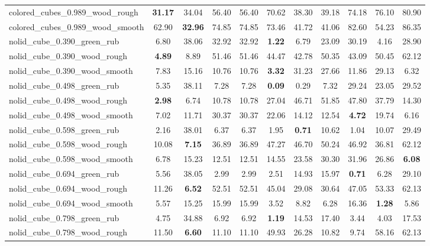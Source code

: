 \begin{table}[H]
{\begin{tabular}{l cccccccccc}
        colored\_cubes\_0.989\_wood\_rough & \textbf{31.17} & 34.04 & 56.40 & 56.40 & 70.62 & 38.30 & 39.18 & 74.18 & 76.10 & 80.90 \\
        colored\_cubes\_0.989\_wood\_smooth & 62.90 & \textbf{32.96} & 74.85 & 74.85 & 73.46 & 41.72 & 41.06 & 82.60 & 54.23 & 86.35 \\
        nolid\_cube\_0.390\_green\_rub & 6.80 & 38.06 & 32.92 & 32.92 & \textbf{1.22} & 6.79 & 23.09 & 30.19 & 4.16 & 28.90 \\
        nolid\_cube\_0.390\_wood\_rough & \textbf{4.89} & 8.89 & 51.46 & 51.46 & 44.47 & 42.78 & 50.35 & 43.09 & 50.45 & 62.12 \\
        nolid\_cube\_0.390\_wood\_smooth & 7.83 & 15.16 & 10.76 & 10.76 & \textbf{3.32} & 31.23 & 27.66 & 11.86 & 29.13 & 6.32 \\
        nolid\_cube\_0.498\_green\_rub & 5.35 & 38.11 & 7.28 & 7.28 & \textbf{0.09} & 0.29 & 7.32 & 29.24 & 23.05 & 29.52 \\
        nolid\_cube\_0.498\_wood\_rough & \textbf{2.98} & 6.74 & 10.78 & 10.78 & 27.04 & 46.71 & 51.85 & 47.80 & 37.79 & 14.30 \\
        nolid\_cube\_0.498\_wood\_smooth & 7.02 & 11.71 & 30.37 & 30.37 & 22.06 & 14.12 & 12.54 & \textbf{4.72} & 19.74 & 6.16 \\
        nolid\_cube\_0.598\_green\_rub & 2.16 & 38.01 & 6.37 & 6.37 & 1.95 & \textbf{0.71} & 10.62 & 1.04 & 10.07 & 29.49 \\
        nolid\_cube\_0.598\_wood\_rough & 10.08 & \textbf{7.15} & 36.89 & 36.89 & 47.27 & 46.70 & 50.24 & 46.92 & 36.81 & 62.12 \\
        nolid\_cube\_0.598\_wood\_smooth & 6.78 & 15.23 & 12.51 & 12.51 & 14.55 & 23.58 & 30.30 & 31.96 & 26.86 & \textbf{6.08} \\
        nolid\_cube\_0.694\_green\_rub & 5.56 & 38.05 & 2.99 & 2.99 & 2.51 & 14.93 & 15.97 & \textbf{0.71} & 6.28 & 29.10 \\
        nolid\_cube\_0.694\_wood\_rough & 11.26 & \textbf{6.52} & 52.51 & 52.51 & 45.04 & 29.08 & 30.64 & 47.05 & 53.33 & 62.13 \\
        nolid\_cube\_0.694\_wood\_smooth & 5.57 & 15.25 & 15.99 & 15.99 & 3.52 & 8.82 & 6.28 & 16.36 & \textbf{1.28} & 5.86 \\
        nolid\_cube\_0.798\_green\_rub & 4.75 & 34.88 & 6.92 & 6.92 & \textbf{1.19} & 14.53 & 17.40 & 3.44 & 4.03 & 17.53 \\
        nolid\_cube\_0.798\_wood\_rough & 11.50 & \textbf{6.60} & 11.10 & 11.10 & 49.93 & 26.28 & 10.82 & 9.74 & 58.16 & 62.13 \\

\end{tabular}}
\end{table}
